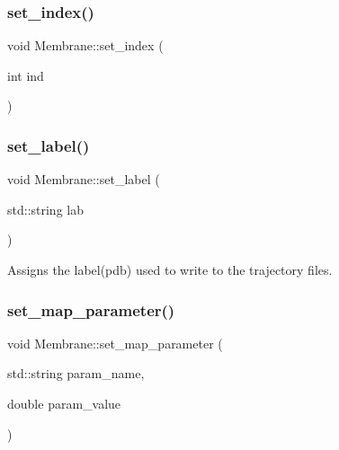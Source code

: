 \mbox{\label{classMembrane_aaf51e7b1813da0f499d36664d7486db7}} 
\subsubsection{\texorpdfstring{set\_index()}{set\_index()}}
{\footnotesize\ttfamily void Membrane\+::set\+\_\+index (\begin{DoxyParamCaption}\item[{int}]{ind }\end{DoxyParamCaption})\hspace{0.3cm}{\ttfamily [inline]}}

\mbox{\label{classMembrane_a5d37c481f978d04a64ea0fd10f5e7708}} 
\subsubsection{\texorpdfstring{set\_label()}{set\_label()}}
{\footnotesize\ttfamily void Membrane\+::set\+\_\+label (\begin{DoxyParamCaption}\item[{std\+::string}]{lab }\end{DoxyParamCaption})\hspace{0.3cm}{\ttfamily [inline]}}

Assigns the label(pdb) used to write to the trajectory files. \mbox{\label{classMembrane_a58d16cfe9b99aebed6484ef9acbfcb95}} 
\subsubsection{\texorpdfstring{set\_map\_parameter()}{set\_map\_parameter()}}
{\footnotesize\ttfamily void Membrane\+::set\+\_\+map\+\_\+parameter (\begin{DoxyParamCaption}\item[{std\+::string}]{param\+\_\+name,  }\item[{double}]{param\+\_\+value }\end{DoxyParamCaption})}

\mbox{\label{classMembrane_abdf30f7d1997c4e01eebf03ab646172a}} 
